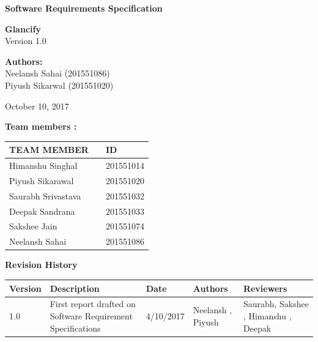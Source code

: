 \documentclass[12pt]{article}
\begin{document}
\begin{titlepage}
	\begin{center}
		
		\LARGE{\textbf{Software Requirements Specification}}
		        
		\vspace{1.5cm}
		      
		\textbf{Glancify} \\
		\small{Version 1.0}
		
					
		\vspace{2cm}
		        
		\large{\textbf{Authors:}}\\
		\large{Neelansh Sahai (201551086)\\
		        Piyush Sikarwal (201551020)
		        }
					
		\vspace{1.5cm}
						
		\large{October  10, 2017}
						
	\end{center}
\end{titlepage}
\newpage
\textbf{Team members :} \\
\begin{center}
	\begin{tabular}{ |m{10em} m{8em} m{9em}|}
		\hline
		TEAM MEMBER        &   & ID        \\
		\hline
		Himanshu Singhal             &   & 201551014 \\
		Piyush Sikarawal          &   & 201551020 \\
		Saurabh Srivastava              &   & 201551032 \\
	    Deepak Sandrana     &   & 201551033 \\
		Sakshee Jain    &   & 201551074 \\
		Neelansh Sahai    &   & 201551086 \\ 
		\hline
	\end{tabular}
	
\end{center}
\newpage
\textbf{Revision History}
\begin{center}
		\begin{tabular}{ | m{2em} | m{8em} | m{4em} | m{5em} | m{5em} | }
			\hline
			Version & Description                         & Date       & Authors                   & Reviewers           \\
			\hline
			1.0     & First report drafted on Software Requirement Specifications & 4/10/2017  & Neelansh , Piyush & Saurabh, Sakshee , Himanshu , Deepak \\
			\hline
			
		\end{tabular}
    		
	\end{center}
\newpage
\tableofcontents
\newpage
\end{document}
